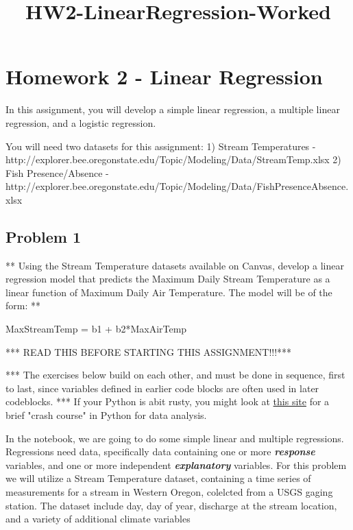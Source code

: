 \documentclass[11pt]{article}
\title{HW2-LinearRegression-Worked}
\begin{document}
    
    
    \maketitle
    
    

    
    \section{Homework 2 - Linear
Regression}\label{homework-2---linear-regression}

In this assignment, you will develop a simple linear regression, a
multiple linear regression, and a logistic regression.

You will need two datasets for this assignment: 1) Stream Temperatures -
http://explorer.bee.oregonstate.edu/Topic/Modeling/Data/StreamTemp.xlsx
2) Fish Presence/Absence -
http://explorer.bee.oregonstate.edu/Topic/Modeling/Data/FishPresenceAbsence.xlsx

    \subsection{Problem 1}\label{problem-1}

** Using the Stream Temperature datasets available on Canvas, develop a
linear regression model that predicts the Maximum Daily Stream
Temperature as a linear function of Maximum Daily Air Temperature. The
model will be of the form: **

MaxStreamTemp = b1 + b2*MaxAirTemp

    *** READ THIS BEFORE STARTING THIS ASSIGNMENT!!!***

*** The exercises below build on each other, and must be done in
sequence, first to last, since variables defined in earlier code blocks
are often used in later codeblocks. *** If your Python is abit rusty,
you might look at
\href{http://nbviewer.jupyter.org/gist/rpmuller/5920182}{this site} for
a brief "crash course" in Python for data analysis.

In the notebook, we are going to do some simple linear and multiple
regressions. Regressions need data, specifically data containing one or
more \textbf{\emph{response}} variables, and one or more independent
\textbf{\emph{explanatory}} variables. For this problem we will utilize
a Stream Temperature dataset, containing a time series of measurements
for a stream in Western Oregon, colelcted from a USGS gaging station.
The dataset include day, day of year, discharge at the stream location,
and a variety of additional climate variables
\end{document}
